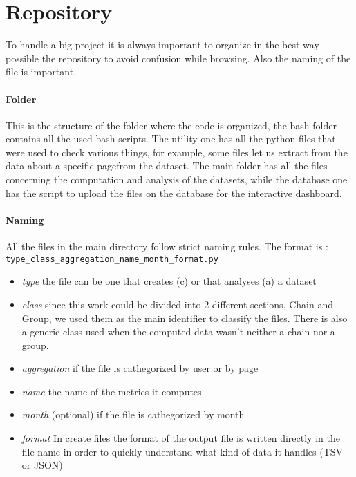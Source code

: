 \section{Repository}
To handle a big project it is always important to organize in the best way possible the repository to avoid
confusion while browsing. Also the naming of the file is important.
\paragraph{Folder}
This is the structure of the folder where the code is organized, the bash folder contains all the used bash
scripts. The utility one has all the python files that were used to check various things, for example,
some files let us extract from the data about a specific pagefrom the dataset. The main
folder has all the files concerning the computation and analysis of the datasets, while the
database one has the script to upload the files on the database for the interactive dashboard.

\paragraph{Naming}
All the files in the main directory follow strict naming rules. The format is : \\
\texttt{type\_class\_aggregation\_name\_month\_format.py}
\begin{itemize}
    \item \textit{type} the file can be one that creates (c) or that analyses (a) a dataset
    \item \textit{class} since this work could be divided into 2 different sections, Chain and Group, we used
    them as the main identifier to classify the files. There is also a generic class used when the computed data
    wasn't neither a chain nor a group.
    \item \textit{aggregation} if the file is cathegorized by user or by page 
    \item \textit{name} the name of the metrics it computes
    \item \textit{month} (optional) if the file is cathegorized by month 
    \item \textit{format} In create files the format of the output file is written directly in the file
    name in order to quickly understand what kind of data it handles (TSV or JSON)
\end{itemize}


